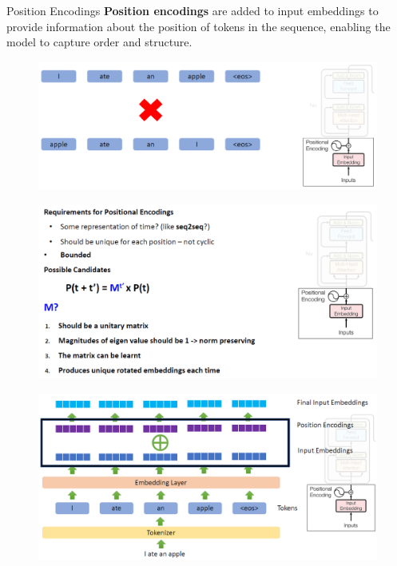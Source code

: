 \begin{frame}[allowframebreaks]{Position Encodings}
    \textbf{Position encodings} are added to input embeddings to provide information about the position of tokens in the sequence, enabling the model to capture order and structure.

    \framebreak
    \begin{figure}
        \centering
        \includegraphics[width=\linewidth, height=0.9\textheight,keepaspectratio]{images/nlp/position-encodings.png}
    \end{figure}

    \framebreak
    \begin{figure}
        \centering
        \includegraphics[width=\linewidth, height=0.9\textheight,keepaspectratio]{images/nlp/position-encodings-2.png}
    \end{figure}

    \framebreak
    \begin{figure}
        \centering
        \includegraphics[width=1.05\linewidth, height=0.9\textheight,keepaspectratio]{images/nlp/position-encodings-3.png}
    \end{figure}
\end{frame}

